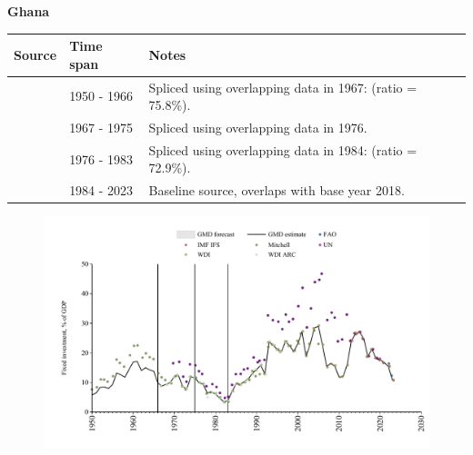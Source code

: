 \documentclass[12pt,a4paper,landscape]{article}
\begin{document}
\begin{adjustbox}{max totalsize={\paperwidth}{\paperheight},center}
\begin{minipage}[t][\textheight][t]{\textwidth}
\vspace*{0.5cm}
{}
\begin{center}
{\Large\bfseries Ghana}
\end{center}
\vspace{0.5cm}
\begin{table}[H]
\centering
\small
\begin{tabular}{|l|l|l|}
\hline
\textbf{Source} & \textbf{Time span} & \textbf{Notes} \\
\hline
\rowcolor{white}\cite{Mitchell}& 1950 - 1966 &Spliced using overlapping data in 1967: (ratio = 75.8\%).\\
\rowcolor{lightgray}\cite{WDI}& 1967 - 1975 &Spliced using overlapping data in 1976.\\
\rowcolor{white}\cite{UN}& 1976 - 1983 &Spliced using overlapping data in 1984: (ratio = 72.9\%).\\
\rowcolor{lightgray}\cite{WDI}& 1984 - 2023 &Baseline source, overlaps with base year 2018.\\
\hline
\end{tabular}
\end{table}
\begin{figure}[H]
\centering
\includegraphics[width=\textwidth,height=0.6\textheight,keepaspectratio]{graphs/GHA_finv_GDP.pdf}
\end{figure}
\end{minipage}
\end{adjustbox}
\end{document}
